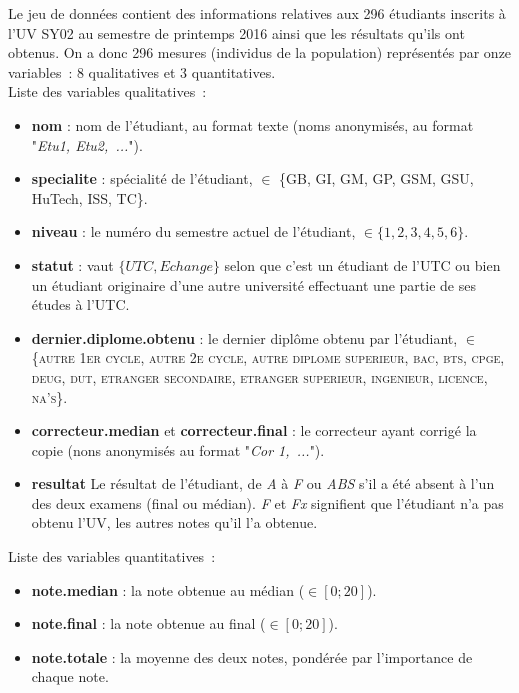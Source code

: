 \documentclass[a4paper,10pt]{report}
\begin{document}
Le jeu de données contient des informations relatives aux 296 étudiants inscrits à l’UV SY02 au semestre de printemps 2016 ainsi que les résultats qu'ils ont obtenus. On a donc 296 mesures (individus de la population) représentés par onze variables~: 8 qualitatives et 3 quantitatives.\\
Liste des variables qualitatives~:
\begin{itemize}
	\item \textbf{nom} : nom de l'étudiant, au format texte (noms anonymisés, au format "\textit{Etu1, Etu2,~...}").
	\item \textbf{specialite} : spécialité de l'étudiant, $\in$ \{GB, GI, GM, GP, GSM, GSU, HuTech, ISS, TC\}.
	\item \textbf{niveau} : le numéro du semestre actuel de l'étudiant, $\in \{1,2,3,4,5,6\}$.
	\item \textbf{statut} : vaut $ \{UTC,Echange\} $ selon que c'est un étudiant de l'UTC ou bien un étudiant originaire d'une autre université effectuant une partie de ses études à l'UTC.
	\item \textbf{dernier.diplome.obtenu} : le dernier diplôme obtenu par l'étudiant, $\in$ \{\textsc{autre 1er cycle, autre 2e cycle, autre diplome superieur, bac, bts, cpge, deug, dut, etranger secondaire, etranger superieur, ingenieur, licence, na's}\}.
	\item \textbf{correcteur.median} et \textbf{correcteur.final} : le correcteur ayant corrigé la copie (nons anonymisés au format "\textit{Cor 1,~...}").
	\item \textbf{resultat} Le résultat de l'étudiant, de \textit{A} à \textit{F} ou \textit{ABS} s'il a été absent à l'un des deux examens (final ou médian). \textit{F} et \textit{Fx} signifient que l'étudiant n'a pas obtenu l'UV, les autres notes qu'il l'a obtenue.
\end{itemize}
Liste des variables quantitatives~:
\begin{itemize}
	\item \textbf{note.median} : la note obtenue au médian ($ \in [0;20] $).
	\item \textbf{note.final} : la note obtenue au final ($ \in [0;20] $).
	\item \textbf{note.totale} : la moyenne des deux notes, pondérée par l'importance de chaque note.
\end{itemize}
\end{document}
